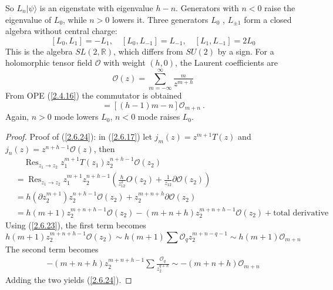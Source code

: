 So $L_n|\psi\rangle$ is an eigenstate with eigenvalue $h-n$. Generators with $n<0$ raise the eigenvalue of $L_{0}$, while $n>0$ lowers it.    
Three generators $L_{0}$ , $L_{\pm 1}$ form a closed algebra without central charge:    
\begin{equation}
	\left[L_{0}, L_{1}\right]=-L_{1}, \quad\left[L_{0}, L_{-1}\right]=L_{-1}, \quad\left[L_{1}, L_{-1}\right]=2 L_{0}
\end{equation}
This is the algebra $SL(2,\mathbb{R})$, which differs from $SU(2)$ by a sign. For a holomorphic tensor field $\mathcal{O}$ with weight $(h,0)$, the Laurent coefficients are    
\begin{equation}
	\mathcal{O}(z)=\sum_{m=-\infty}^{\infty} \frac{_m}{z^{m+h}} \label{2.6.23}
\end{equation}
From OPE (\ref{2.4.16}) the commutator is obtained    
\begin{equation}
	[L_{m}, \mathcal{O}_{n}]=[(h-1) m-n] \mathcal{O}_{m+n} \:.
	\label{2.6.24}
\end{equation}
Again, $n>0$ mode lowers $L_0$, $n<0$ mode raises $L_0$.    

\begin{tcolorbox}[breakable]
	\begin{proof}
		Proof of (\ref{2.6.24}): in (\ref{2.6.17}) let $j_{m}(z)=z^{m+1} T(z)$ and $j_{n}(z)=z^{n+h-1} \mathcal{O}(z)$, then    
		\begin{align*}
			&\quad \operatorname{Res}_{z_1 \rightarrow z_2}  z_1^{m+1} T(z_{1}) z_2^{n+h-1} \mathcal{O}(z_{2})\\
			&=\operatorname{Res}_{z_1 \rightarrow z_2} z_1^{m+1} z_2^{n+h-1}\left(\frac{h}{z_{12}^2} O(z_2)+\frac{1}{z_{12}} \partial \mathcal{O}(z_2)\right)\\
			&=h(\partial z_2^{m+1})z_2^{n+h-1}\mathcal{O}(z_2)+z_2^{m+n+h}\partial\mathcal{O}(z_2)\\
			&=h(m+1)z_2^{m+n+h-1}\mathcal{O}(z_2)-(m+n+h)z_2^{m+n+h-1}\mathcal{O}(z_2)+ \text{total derivative}
		\end{align*}
		Using (\ref{2.6.23}), the first term becomes    
		$$h(m+1)z_2^{m+n+h-1}\mathcal{O}(z_2) \sim h(m+1) \sum \mathcal{O}_q z_2^{m+n-q-1} \sim h(m+1)\mathcal{O}_{m+n}$$
		The second term becomes    
		\begin{align*}
			-(m+n+h) z_{2}^{m+n+h-1} \sum \frac{\mathcal{O}_{q}}{z_{2}^{q+h}} \sim-(m+n+h) \mathcal{O}_{m+n}
		\end{align*}
		Adding the two yields (\ref{2.6.24}).    
	\end{proof}
\end{tcolorbox}

